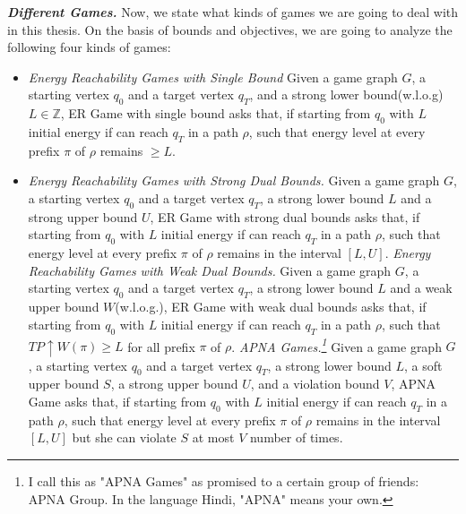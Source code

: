 \textbf{\textit{Different Games.}} Now, we state what kinds of games we are going to deal with in this thesis. On the basis of bounds and objectives, we are going to analyze the following four kinds of games:
\begin{itemize}
\item \textit{Energy Reachability Games with Single Bound} Given a game graph $G$, a starting vertex $q_0$ and a target vertex $q_T$, and a strong lower bound(w.l.o.g) $L \in \mathbb{Z}$, ER Game with single bound asks that, if starting from $q_0$ with $L$ initial energy if  can reach $q_T$ in a path $\rho$, such that energy level at every prefix $\pi$ of $\rho$ remains $\geq L$.
\vskip 0.5cm
\item \textit{Energy Reachability Games with Strong Dual Bounds.} Given a game graph $G$, a starting vertex $q_0$ and a target vertex $q_T$, a strong lower bound $L$ and a strong upper bound $U$, ER Game with strong dual bounds asks that, if starting from $q_0$ with $L$ initial energy if  can reach $q_T$ in a path $\rho$, such that energy level at every prefix $\pi$ of $\rho$ remains in the interval $[L,U]$.
\vskip 0.5cm
\textit{Energy Reachability Games with Weak Dual Bounds.} Given a game graph $G$, a starting vertex $q_0$ and a target vertex $q_T$, a strong lower bound $L$ and a weak upper bound $W$(w.l.o.g.), ER Game with weak dual bounds asks that, if starting from $q_0$ with $L$ initial energy if  can reach $q_T$ in a path $\rho$, such that $TP\uparrow{W}(\pi) \geq L$ for all prefix $\pi$ of $\rho$.
\vskip 0.5cm
\textit{APNA Games.\footnote{I call this as "APNA Games" as promised to a certain group of friends: APNA Group. In the language Hindi, "APNA" means your own.}} Given a game graph $G$, a starting vertex $q_0$ and a target vertex $q_T$, a strong lower bound $L$, a soft upper bound $S$, a strong upper bound $U$, and a violation bound $V$, APNA Game asks that, if starting from $q_0$ with $L$ initial energy if  can reach $q_T$ in a path $\rho$, such that energy level at every prefix $\pi$ of $\rho$ remains in the interval $[L,U]$ but she can violate $S$ at most $V$ number of times.
 \end{itemize}
 \vskip 0.6cm
 
